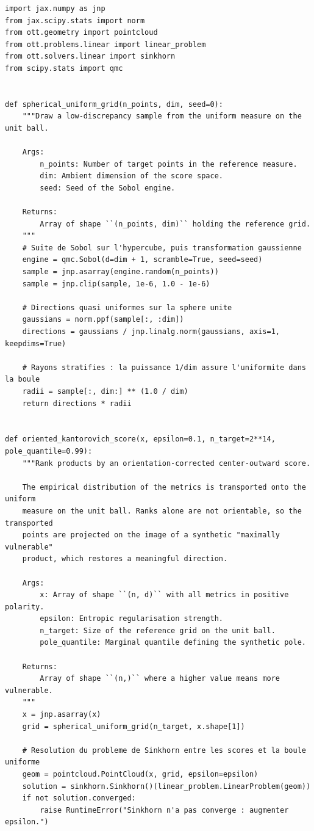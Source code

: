 \documentclass[11pt,a4paper]{article}
\theoremstyle{definition}
\theoremstyle{remark}
\begin{document}
\begin{lstlisting}
import jax.numpy as jnp
from jax.scipy.stats import norm
from ott.geometry import pointcloud
from ott.problems.linear import linear_problem
from ott.solvers.linear import sinkhorn
from scipy.stats import qmc


def spherical_uniform_grid(n_points, dim, seed=0):
    """Draw a low-discrepancy sample from the uniform measure on the unit ball.

    Args:
        n_points: Number of target points in the reference measure.
        dim: Ambient dimension of the score space.
        seed: Seed of the Sobol engine.

    Returns:
        Array of shape ``(n_points, dim)`` holding the reference grid.
    """
    # Suite de Sobol sur l'hypercube, puis transformation gaussienne
    engine = qmc.Sobol(d=dim + 1, scramble=True, seed=seed)
    sample = jnp.asarray(engine.random(n_points))
    sample = jnp.clip(sample, 1e-6, 1.0 - 1e-6)

    # Directions quasi uniformes sur la sphere unite
    gaussians = norm.ppf(sample[:, :dim])
    directions = gaussians / jnp.linalg.norm(gaussians, axis=1, keepdims=True)

    # Rayons stratifies : la puissance 1/dim assure l'uniformite dans la boule
    radii = sample[:, dim:] ** (1.0 / dim)
    return directions * radii


def oriented_kantorovich_score(x, epsilon=0.1, n_target=2**14, pole_quantile=0.99):
    """Rank products by an orientation-corrected center-outward score.

    The empirical distribution of the metrics is transported onto the uniform
    measure on the unit ball. Ranks alone are not orientable, so the transported
    points are projected on the image of a synthetic "maximally vulnerable"
    product, which restores a meaningful direction.

    Args:
        x: Array of shape ``(n, d)`` with all metrics in positive polarity.
        epsilon: Entropic regularisation strength.
        n_target: Size of the reference grid on the unit ball.
        pole_quantile: Marginal quantile defining the synthetic pole.

    Returns:
        Array of shape ``(n,)`` where a higher value means more vulnerable.
    """
    x = jnp.asarray(x)
    grid = spherical_uniform_grid(n_target, x.shape[1])

    # Resolution du probleme de Sinkhorn entre les scores et la boule uniforme
    geom = pointcloud.PointCloud(x, grid, epsilon=epsilon)
    solution = sinkhorn.Sinkhorn()(linear_problem.LinearProblem(geom))
    if not solution.converged:
        raise RuntimeError("Sinkhorn n'a pas converge : augmenter epsilon.")


\end{lstlisting}
\end{document}
